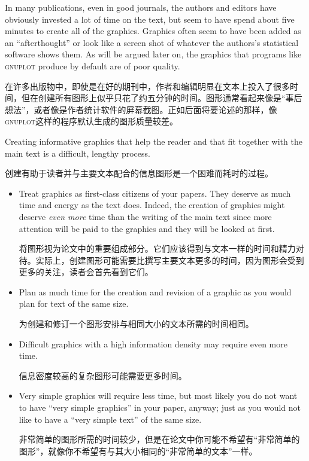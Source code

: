 In many publications, even in good journals, the authors and editors have
obviously  invested a lot of time on the text, but seem to have spend about
five minutes to create all of the graphics. Graphics often seem to have been
added as an ``afterthought'' or look like a screen shot of whatever the
authors's statistical software shows them. As will be argued later on, the
graphics that programs like \textsc{gnuplot} produce by default are of poor
quality.

在许多出版物中，即使是在好的期刊中，作者和编辑明显在文本上投入了很多时间，但在创建所有图形上似乎只花了约五分钟的时间。图形通常看起来像是“事后想法”，或者像是作者统计软件的屏幕截图。正如后面将要论述的那样，像\textsc{gnuplot}这样的程序默认生成的图形质量较差。

Creating informative graphics that help the reader and that fit together with
the main text is a difficult, lengthy process.

创建有助于读者并与主要文本配合的信息图形是一个困难而耗时的过程。
%
\begin{itemize}
    \item Treat graphics as first-class citizens of your papers. They deserve
        as much time and energy as the text does. Indeed, the creation of
        graphics might deserve \emph{even more} time than the writing of the
        main text since more attention will be paid to the graphics and they
        will be looked at first.

        将图形视为论文中的重要组成部分。它们应该得到与文本一样的时间和精力对待。实际上，创建图形可能需要比撰写主要文本更多的时间，因为图形会受到更多的关注，读者会首先看到它们。

    \item Plan as much time for the creation and revision of a graphic as you
        would plan for text of the same size.

        为创建和修订一个图形安排与相同大小的文本所需的时间相同。


    \item Difficult graphics with a high information density may require even
        more time.

        信息密度较高的复杂图形可能需要更多时间。


    \item Very simple graphics will require less time, but most likely you do
        not want to have ``very simple graphics'' in your paper, anyway; just
        as you would not like to have a ``very simple text'' of the same
        size.

        非常简单的图形所需的时间较少，但是在论文中你可能不希望有“非常简单的图形”，就像你不希望有与其大小相同的“非常简单的文本”一样。


\end{itemize}


